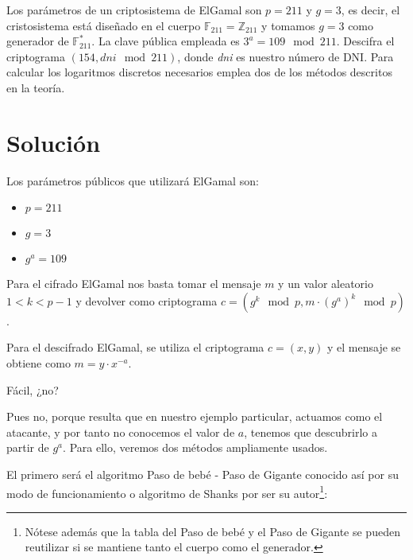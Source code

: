 	Los parámetros  de un criptosistema de ElGamal son $p = 211$ y $g = 3$, es decir, el cristosistema está
	diseñado en el cuerpo $\mathbb{F}_{211} = \mathbb{Z}_{211}$ y tomamos $g = 3$ como generador de
	$\mathbb{F}^*_{211}$. La clave pública empleada es $3^a = 109  \mod 211$. Descifra el criptograma
	$(154, \textit{dni} \mod 211)$, donde \textit{dni} es nuestro número de DNI. Para calcular los logaritmos
	discretos necesarios emplea dos de los métodos descritos en la teoría.
\section*{Solución}
	Los parámetros públicos que utilizará ElGamal son:
	\begin{itemize}
		\item $p = 211$
		\item $g = 3$
		\item $g^a = 109$
	\end{itemize}
	
	Para el cifrado ElGamal nos basta tomar el mensaje $m$ y un valor aleatorio $1 < k < p-1$ y devolver como
	criptograma $c = \left(g^k \mod p, m \cdot \left(g^a\right)^k \mod p\right)$.
	
	Para el descifrado ElGamal, se utiliza el criptograma $c = \left(x, y\right)$ y el mensaje se obtiene como
	$m = y \cdot x^{-a}$.
	
	Fácil, ¿no?
	
	Pues no, porque resulta que en nuestro ejemplo particular, actuamos como el atacante, y por tanto no conocemos
	el valor de $a$, tenemos que descubrirlo a partir de $g^a$. Para ello, veremos dos métodos ampliamente usados.
	
	El primero será el algoritmo Paso de bebé - Paso de Gigante conocido así por su modo de funcionamiento o
	algoritmo de Shanks por ser su autor\footnote{Nótese además que la tabla del Paso de bebé y el Paso de Gigante
	se pueden reutilizar si se mantiene tanto el cuerpo como el generador.}:
	
